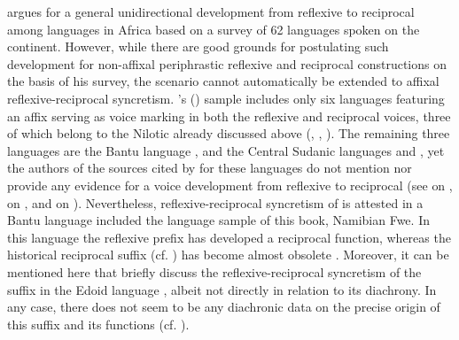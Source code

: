 \citet{heine:2000} argues for a general unidirectional development from reflexive to reciprocal among languages in Africa based on a survey of 62 languages spoken on the continent. However, while there are good grounds for postulating such development for non-affixal periphrastic reflexive and reciprocal constructions on the basis of his survey, the scenario cannot automatically be extended to affixal reflexive-reciprocal syncretism. \citeauthor{heine:2000}’s (\citeyear[20ff.]{heine:2000}) sample includes only six languages featuring an affix serving as voice marking in both the reflexive and reciprocal voices, three of which belong to the Nilotic  already discussed above (, , ). The remaining three languages are the Bantu language , and the Central Sudanic languages  and , yet the authors of the sources cited by \citeauthor{heine:2000} for these languages do not mention nor provide any evidence for a voice development from reflexive to reciprocal (see \citealt{childs:1995} on , \citealt{vorbichler:1965} on , and \citealt{larochette:1958} on ). Nevertheless, reflexive-reciprocal syncretism of  is attested in a Bantu language included the language sample of this book, Namibian Fwe. In this language the reflexive prefix  has developed a reciprocal function, whereas the historical reciprocal suffix  (cf.  ) has become almost obsolete \citep[257ff., 270f.]{gunnink:2018}. Moreover, it can be mentioned here that \citet{heine:miyashita:2008} briefly discuss the reflexive-reciprocal syncretism of the suffix  in the Edoid language , albeit not directly in relation to its diachrony. In any case, there does not seem to be any diachronic data on the precise origin of this suffix and its functions (cf. \citealt{kari:2004}).

